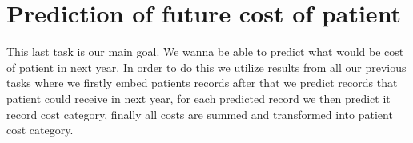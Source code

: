 



\section{Prediction of future cost of patient}
\label{pat_fut_pred_met}

This last task is our main goal. We wanna be able to predict what would be cost of patient in next year. In order to do this we utilize results from all our previous tasks where we firstly embed patients records after that we predict records that patient could receive in next year, for each predicted record we then predict it record cost category, finally all costs are summed and transformed into patient cost category.  
